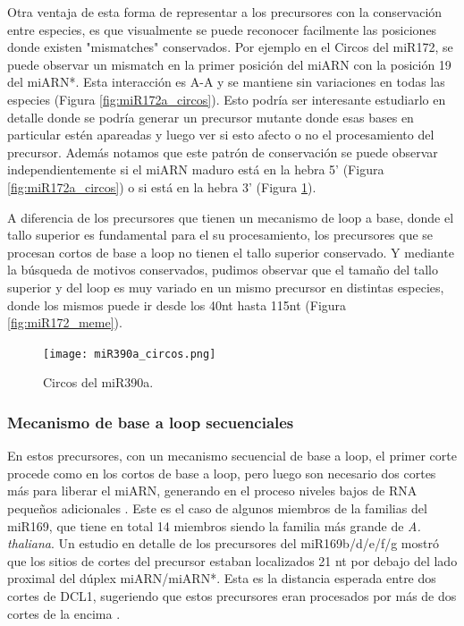 Otra ventaja de esta forma de representar a los precursores con la conservación entre especies, es que visualmente se puede reconocer facilmente las posiciones donde existen "mismatches" conservados. 
Por ejemplo en el Circos del miR172, se puede observar un mismatch en la primer posición del miARN con la posición 19 del miARN*.
Esta interacción es A-A y se mantiene sin variaciones en todas las especies (Figura \ref{fig:miR172a_circos}).
Esto podría ser interesante estudiarlo en detalle donde se podría generar un precursor mutante donde esas bases en particular estén apareadas y luego ver si esto afecto o no el procesamiento del precursor.  
Además notamos que este patrón de conservación se puede observar independientemente si el miARN maduro está en la hebra 5' (Figura \ref{fig:miR172a_circos}) o si está en la hebra 3' (Figura \ref{fig:miR390a_circos}).

A diferencia de los precursores que tienen un mecanismo de loop a base, donde el tallo superior es fundamental para el su procesamiento, los precursores que se procesan cortos de base a loop no tienen el tallo superior conservado.
Y mediante la búsqueda de motivos conservados, pudimos observar que el tamaño del tallo superior y del loop es muy variado en un mismo precursor en distintas especies, donde los mismos puede ir desde los 40nt hasta 115nt (Figura \ref{fig:miR172_meme}).


\begin{figure}[htbp!] 
    \centering    
    \texttt{[image: miR390a\_circos.png]}
    \caption[Circos del miR172a]{Circos del miR390a.}
     \label{fig:miR390a_circos}
\end{figure}

\subsubsection{Mecanismo de base a loop secuenciales}

En estos precursores, con un mecanismo secuencial de base a loop, el primer corte procede como en los cortos de base a loop, pero luego son necesario dos cortes más para liberar el miARN, generando en el proceso niveles bajos de RNA pequeños adicionales \citep{Bologna2013}.
Este es el caso de algunos miembros de la  familias del miR169, que tiene en total 14 miembros siendo la familia más grande de \textit{A. thaliana}.
Un estudio en detalle de los precursores del miR169b/d/e/f/g mostró que los sitios de cortes del precursor estaban localizados 21 nt por debajo del lado proximal del dúplex miARN/miARN*.
Esta es la distancia esperada entre dos cortes de DCL1, sugeriendo que estos precursores eran procesados por más de dos cortes de la encima \citep{Bologna2013}.

